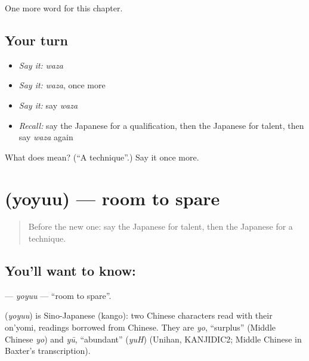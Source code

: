 \begin{grammarlens}[title={What you've built}]
One more word for this chapter.
\end{grammarlens}

\subsection*{Your turn}
\begin{itemize}
\raggedright
  \item \emph{Say it:} \emph{waza}
  \item \emph{Say it:} \emph{waza}, once more
  \item \emph{Say it:} say \emph{waza}
  \item \emph{Recall:} say the Japanese for a qualification, then the Japanese for talent, then say \emph{waza} again
\end{itemize}

\begin{tcolorbox}[breakable,colback=teal!4,colframe=teal!35!black,title={Before you move on}]
What does  mean? (\textquotedblleft{}A technique\textquotedblright{}.) Say it once more.
\end{tcolorbox}
\section[\texorpdfstring{\ja{よゆう} (yoyuu)}{よゆう (yoyuu)}]{ (yoyuu) — room to spare}

\label{lesson:JA-C96-yoyuu}



\begin{quote}
Before the new one: say the Japanese for talent, then the Japanese for a technique.
\end{quote}

\subsection*{You'll want to know: }
\textbf{} — \emph{yoyuu} — \textquotedblleft{}room to spare\textquotedblright{}.

\begin{cousinweb}
\textbf{} (\emph{yoyuu}) is Sino-Japanese (kango): two Chinese characters read with their on'yomi, readings borrowed from Chinese. They are \emph{yo}, \textquotedblleft{}surplus\textquotedblright{} (Middle Chinese \emph{yo}) and \emph{yū}, \textquotedblleft{}abundant\textquotedblright{} (\emph{yuH}) (Unihan, KANJIDIC2; Middle Chinese in Baxter's transcription).
\end{cousinweb}

